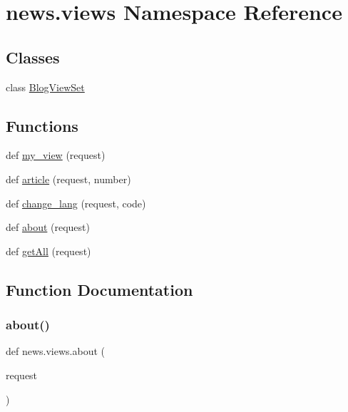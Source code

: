 \hypertarget{namespacenews_1_1views}{}\section{news.\+views Namespace Reference}
\label{namespacenews_1_1views}
\subsection*{Classes}
\begin{DoxyCompactItemize}
\item 
class \mbox{\hyperlink{classnews_1_1views_1_1_blog_view_set}{Blog\+View\+Set}}
\end{DoxyCompactItemize}
\subsection*{Functions}
\begin{DoxyCompactItemize}
\item 
def \mbox{\hyperlink{namespacenews_1_1views_a9b0aa87e18d6a69dace52301e34fbfff}{my\+\_\+view}} (request)
\item 
def \mbox{\hyperlink{namespacenews_1_1views_a8340d5eecfeb6b527e83164ebf11580b}{article}} (request, number)
\item 
def \mbox{\hyperlink{namespacenews_1_1views_a9f55268cd38d1b07e5d941a907d342cc}{change\+\_\+lang}} (request, code)
\item 
def \mbox{\hyperlink{namespacenews_1_1views_a6da9b0f94e29b0e9c1a410bfdda103c5}{about}} (request)
\item 
def \mbox{\hyperlink{namespacenews_1_1views_a89cc055821d1237b88ca3cf30f78f71f}{get\+All}} (request)
\end{DoxyCompactItemize}


\subsection{Function Documentation}
\mbox{\label{namespacenews_1_1views_a6da9b0f94e29b0e9c1a410bfdda103c5}} 
\subsubsection{\texorpdfstring{about()}{about()}}
{\footnotesize\ttfamily def news.\+views.\+about (\begin{DoxyParamCaption}\item[{}]{request }\end{DoxyParamCaption})}

